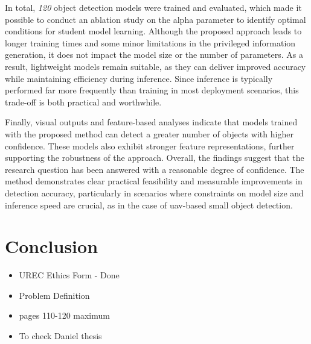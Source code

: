 In total, \textit{120} object detection models were trained and evaluated, which made it possible to conduct an ablation study on the \gls{alpha} parameter to identify optimal conditions for student model learning. Although the proposed approach leads to longer training times and some minor limitations in the privileged information generation, it does not impact the model size or the number of parameters. As a result, lightweight models remain suitable, as they can deliver improved accuracy while maintaining efficiency during inference. Since inference is typically performed far more frequently than training in most deployment scenarios, this trade-off is both practical and worthwhile.

Finally, visual outputs and feature-based analyses indicate that models trained with the proposed method can detect a greater number of objects with higher confidence. These models also exhibit stronger feature representations, further supporting the robustness of the approach. Overall, the findings suggest that the research question has been answered with a reasonable degree of confidence. The method demonstrates clear practical feasibility and measurable improvements in detection accuracy, particularly in scenarios where constraints on model size and inference speed are crucial, as in the case of \gls{uav}-based small object detection.



\section{Conclusion}
\label{sec:5_conclusion}




\begin{itemize}
    \item UREC Ethics Form - Done
    \item Problem Definition
    \item pages 110-120 maximum
    \item To check Daniel thesis
\end{itemize}


